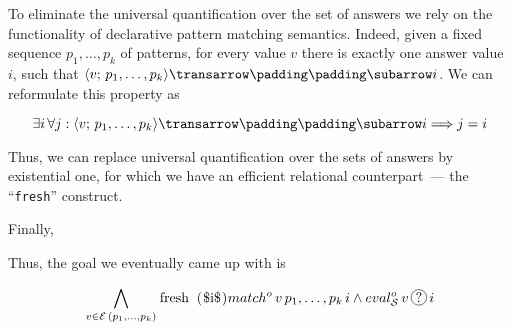 \setarrow{\xrightarrow}

To eliminate the universal quantification over the set of answers we rely on the functionality of declarative pattern matching semantics. Indeed, given a fixed sequence $p_1,\dots,p_k$
of patterns, for every value $v$ there is exactly one answer value $i$, such that $\trans{\inbr{v;\,p_1,\dots,p_k}}{}{i}$. We can reformulate this property as

\[
\exists i\, \forall j : \trans{\inbr{v;\,p_1,\dots,p_k}}{}{i} \Longrightarrow  j=i
\]

Thus, we can replace universal quantification over the sets of answers by existential one, for which we have an efficient relational counterpart~--- the ``\lstinline|fresh|''
construct.

Finally,

Thus, the goal we eventually came up with is

\[
\bigwedge_{v\in\mathcal{E}\,(p_1,\dots,p_k)}\mbox{\lstinline|fresh ($i$)|} match^o\,v\,p_1,\dots,p_k\,i \wedge eval^o_{\mathcal S}\,v\,\circled{?}\,i
\]

